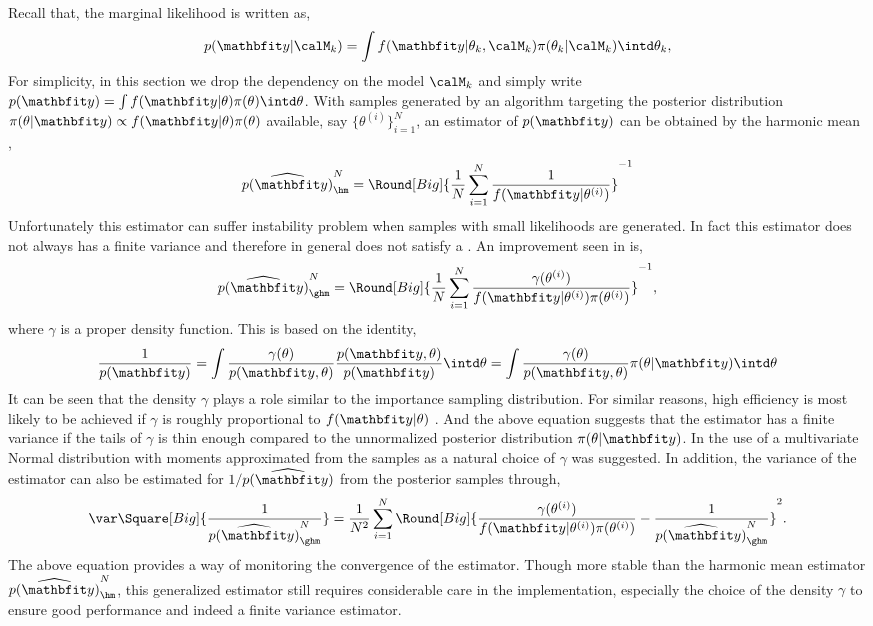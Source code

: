 Recall that, the marginal likelihood is written as,
\begin{equation*}
  p(\data|\calM_k) = \int
  f(\data|\theta_k,\calM_k)\pi(\theta_k|\calM_k)\intd\theta_k,
\end{equation*}
For simplicity, in this section we drop the dependency on the model $\calM_k$
and simply write $p(\data) = \int f(\data|\theta)\pi(\theta)\intd\theta$.
With samples generated by an \mcmc algorithm targeting the posterior
distribution $\pi(\theta|\data) \propto f(\data|\theta) \pi(\theta)$
available, say $\{\theta^{(i)}\}_{i=1}^N$, an estimator of $p(\data)$ can be
obtained by the harmonic mean \cite{Newton:1994wm},
\begin{equation}
  \widehat{p(\data)}_{\hm}^N =
  \Round[Big]{\frac{1}{N}\sum_{i=1}^N\frac{1}{f(\data|\theta^{(i)})}}^{-1}
\end{equation}
Unfortunately this estimator can suffer instability problem when samples with
small likelihoods are generated. In fact this estimator does not always has a
finite variance and therefore in general does not satisfy a \clt. An
improvement seen in \cite{Kass:1995vb} is,
\begin{equation}
  \widehat{p(\data)}_{\ghm}^N = \Round[Big]{
    \frac{1}{N}\sum_{i=1}^N
    \frac{\gamma(\theta^{(i)})}{f(\data|\theta^{(i)})\pi(\theta^{(i)})}}^{-1},
\end{equation}
where $\gamma$ is a proper density function. This is based on the identity,
\begin{equation}
  \frac{1}{p(\data)}
  = \int \frac{\gamma(\theta)}{p(\data,\theta)}
  \frac{p(\data,\theta)}{p(\data)} \intd \theta
  = \int \frac{\gamma(\theta)}{p(\data,\theta)} \pi(\theta|\data) \intd \theta
\end{equation}
It can be seen that the density $\gamma$ plays a role similar to the
importance sampling distribution. For similar reasons, high efficiency is most
likely to be achieved if $\gamma$ is roughly proportional to $f(\data|\theta)$
\cite{Kass:1995vb}. And the above equation suggests that the estimator has a
finite variance if the tails of $\gamma$ is thin enough compared to the
unnormalized posterior distribution $\pi(\theta|\data)$.
In \cite{Gelfand:1994ux} the use of a multivariate Normal distribution
with moments approximated from the samples as a natural choice of $\gamma$ was
suggested. In addition, the variance of the estimator can also be estimated
for $1/\widehat{p(\data)}$ from the posterior samples through,
\begin{equation}
  \var\Square[Big]{\frac{1}{\widehat{p(\data)}_{\ghm}^N}} =
  \frac{1}{N^2}\sum_{i=1}^N \Round[Big]{
    \frac{\gamma(\theta^{(i)})}{f(\data|\theta^{(i)})\pi(\theta^{(i)})}
    - \frac{1}{\widehat{p(\data)}_{\ghm}^N}}^2.
\end{equation}
The above equation provides a way of monitoring the convergence of the
estimator. Though more stable than the harmonic mean estimator
$\widehat{p(\data)}_{\hm}^N$, this generalized estimator still requires
considerable care in the implementation, especially the choice of the density
$\gamma$ to ensure good performance and indeed a finite variance estimator.

